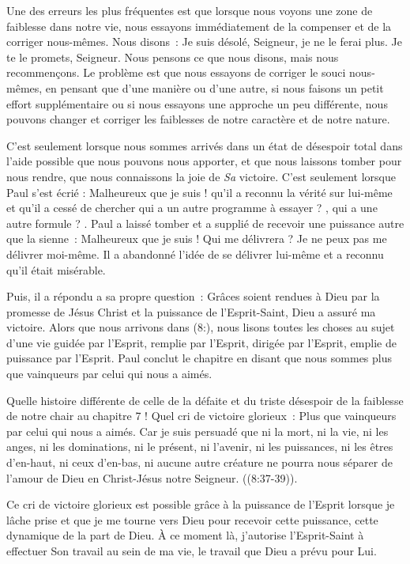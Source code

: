 Une des erreurs les plus fréquentes est que lorsque nous voyons une zone
 de faiblesse dans notre vie, nous essayons immédiatement de la compenser
 et de la corriger nous-mêmes. Nous disons~:
 \og Je suis désolé, Seigneur, je ne le ferai plus.
 Je te le promets, Seigneur. \fg{}
 Nous pensons ce que nous disons, mais nous recommençons.
 Le problème est que nous essayons de corriger le souci nous-mêmes,
 en pensant que d'une manière ou d'une autre, si nous faisons un petit effort
 supplémentaire ou si nous essayons une approche un peu différente,
 nous pouvons changer et corriger les faiblesses de notre caractère
 et de notre nature.

C'est seulement lorsque nous sommes arrivés dans un état de désespoir total
 dans l'aide possible que nous pouvons nous apporter, et que nous laissons
 tomber pour nous rendre, que nous connaissons la joie de \emph{Sa} victoire.
 C'est seulement lorsque Paul s'est écrié :
 \og Malheureux que je suis ! \fg{} qu'il a reconnu la vérité sur lui-même
 et qu'il a cessé de chercher \og qui a un autre programme à essayer ? \fg{},
 \og qui a une autre formule ? \fg{}.
 Paul a laissé tomber et a supplié de recevoir une puissance
 autre que la sienne~: \og Malheureux que je suis ! Qui me délivrera ?
 Je ne peux pas me délivrer moi-même. \fg{}
 Il a abandonné l'idée de se délivrer lui-même et a reconnu
 qu'il était misérable.

Puis, il a répondu a sa propre question~:
 \og Grâces soient rendues à Dieu par la promesse de Jésus Christ
 et la puissance de l'Esprit-Saint, Dieu a assuré ma victoire. \fg{}
 Alors que nous arrivons dans (8:),
 nous lisons toutes les choses au sujet d'une vie guidée par l'Esprit,
 remplie par l'Esprit, dirigée par l'Esprit, emplie de puissance par l'Esprit.
 Paul conclut le chapitre en disant que nous sommes \og plus que vainqueurs
 par celui qui nous a aimés. \fg{}

Quelle histoire différente de celle de la défaite et du triste désespoir
 de la faiblesse de notre chair au chapitre 7 !
 Quel cri de victoire glorieux~:
 \og Plus que vainqueurs par celui qui nous a aimés.
 Car je suis persuadé que ni la mort, ni la vie, ni les anges,
 ni les dominations, ni le présent, ni l'avenir, ni les puissances,
 ni les êtres d'en-haut, ni ceux d'en-bas, ni aucune autre créature
 ne pourra nous séparer de l'amour de Dieu en Christ-Jésus
 notre Seigneur. \fg{} ((8:37-39)).

Ce cri de victoire glorieux est possible grâce à la puissance de l'Esprit
 lorsque je lâche prise et que je me tourne vers Dieu pour recevoir
 cette puissance, cette dynamique de la part de Dieu. À ce moment là,
 j'autorise l'Esprit-Saint à effectuer Son travail au sein de ma vie,
 le travail que Dieu a prévu pour Lui.


